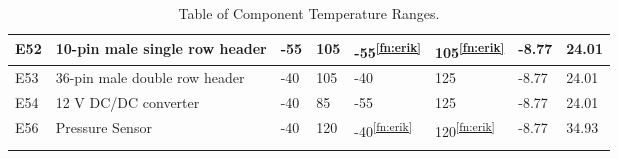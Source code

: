 \begin{longtable}{|m{1cm}|m{3.5cm}|m{1.3cm}|m{1.3cm}|m{1.4cm}|m{1.3cm}|m{1.3cm}|m{1.3cm}|}
E52 & 10-pin male single row header & -55 & 105 & -55\textsuperscript{\ref{fn:erik}} & 105\textsuperscript{\ref{fn:erik}} & -8.77 & 24.01  \\ \hline
E53 & 36-pin male double row header & -40 & 105 & -40 & 125 & -8.77 & 24.01  \\ \hline
E54 & 12 V DC/DC converter & -40 & 85 & -55 & 125 & -8.77 & 24.01  \\ \hline
E56 & Pressure Sensor & -40 & 120 & -40\textsuperscript{\ref{fn:erik}} & 120\textsuperscript{\ref{fn:erik}} &  -8.77 & 34.93 \\ \hline


\caption{Table of Component Temperature Ranges.}
\label{tab:thermal-table}
\end{longtable}
\raggedbottom








